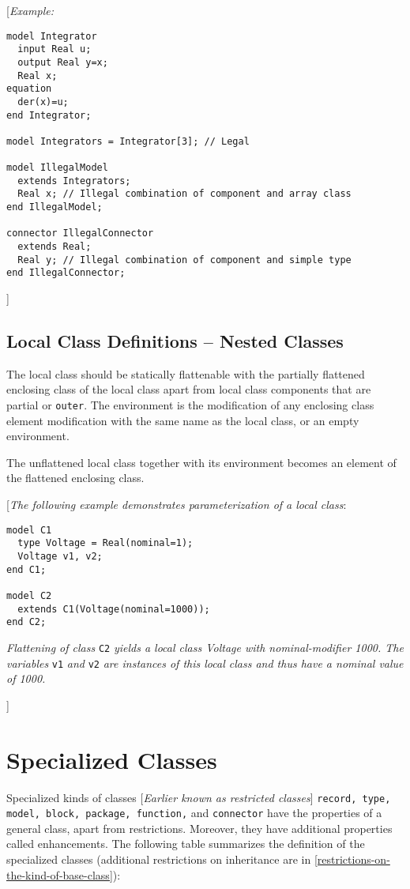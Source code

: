 {[}\emph{Example:}
\begin{lstlisting}[language=modelica]
model Integrator
  input Real u;
  output Real y=x;
  Real x;
equation
  der(x)=u;
end Integrator;

model Integrators = Integrator[3]; // Legal

model IllegalModel
  extends Integrators;
  Real x; // Illegal combination of component and array class
end IllegalModel;

connector IllegalConnector
  extends Real;
  Real y; // Illegal combination of component and simple type
end IllegalConnector;
\end{lstlisting}

{]}

\subsection{Local Class Definitions -- Nested Classes}

The local class should be statically flattenable with the partially
flattened enclosing class of the local class apart from local class
components that are partial or \lstinline!outer!. The environment is the
modification of any enclosing class element modification with the same
name as the local class, or an empty environment.

The unflattened local class together with its environment becomes an
element of the flattened enclosing class.

{[}\emph{The following example demonstrates parameterization of a local
class}:
\begin{lstlisting}[language=modelica]
model C1
  type Voltage = Real(nominal=1);
  Voltage v1, v2;
end C1;

model C2
  extends C1(Voltage(nominal=1000));
end C2;
\end{lstlisting}

\emph{Flattening of class} \lstinline!C2! \emph{yields a local class Voltage with
nominal-modifier 1000. The variables} \lstinline!v1! \emph{and} \lstinline!v2! \emph{are
instances of this local class and thus have a nominal value of 1000.}

{]}

\section{Specialized Classes}

Specialized kinds of classes {[}\emph{Earlier known as restricted
classes}{]} \lstinline!record, type, model, block, package, function,! and \lstinline!connector!
have the properties of a general class, apart from restrictions.
Moreover, they have additional properties called enhancements. The
following table summarizes the definition of the specialized classes
(additional restrictions on inheritance are in \autoref{restrictions-on-the-kind-of-base-class}):

